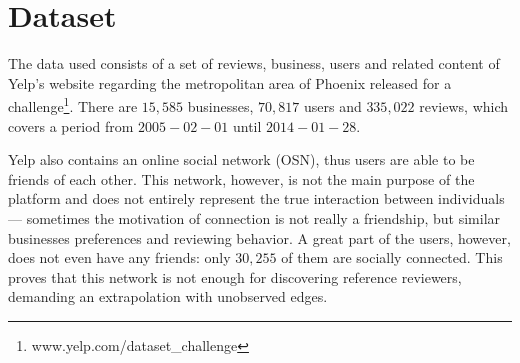 \section{Dataset}
The data used consists of a set of reviews, business, users and related content
of Yelp's website regarding the metropolitan area of Phoenix released for a
challenge\footnote{www.yelp.com/dataset\_challenge}. There are $15,585$
businesses, $70,817$ users and $335,022$ reviews, which covers a period from
$2005-02-01$ until $2014-01-28$.

Yelp also contains an online social network (OSN), thus users are able to be
friends of each other. This network, however, is not the main purpose of the
platform and does not entirely represent the true interaction between
individuals --- sometimes the motivation of connection is not really a
friendship, but similar businesses preferences and reviewing behavior. A great
part of the users, however, does not even have any friends: only $30,255$ of
them are socially connected. This proves that this network is not enough for
discovering reference reviewers, demanding an extrapolation with unobserved
edges.
